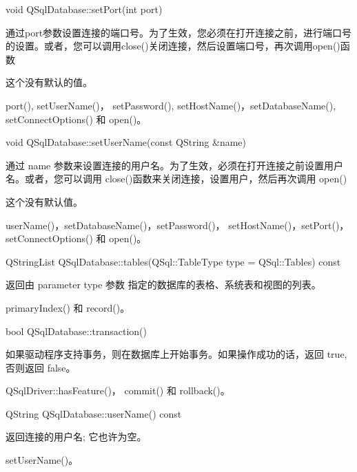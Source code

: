 void QSqlDatabase::setPort(int port)

通过port参数设置连接的端口号。为了生效，您必须在打开连接之前，进行端口号的设置。或者，您可以调用close()关闭连接，然后设置端口号，再次调用open()函数

这个没有默认的值。

\begin{notice}[另请查阅]
port(), setUserName()， setPassword(),
setHostName()，setDatabaseName(), setConnectOptions() 和 open()。
\end{notice}


void QSqlDatabase::setUserName(const QString \&name)

通过 name 参数来设置连接的用户名。为了生效，必须在打开连接之前设置用户名。或者，您可以调用 close()函数来关闭连接，设置用户，然后再次调用 open()

这个没有默认值。


\begin{notice}[另请查阅]
userName()，setDatabaseName()，setPassword()，
setHostName()，setPort()，setConnectOptions() 和 open()。
\end{notice}


QStringList QSqlDatabase::tables(QSql::TableType type = QSql::Tables) const

返回由 parameter type 参数 指定的数据库的表格、系统表和视图的列表。

\begin{notice}[另请查阅]
primaryIndex() 和 record()。
\end{notice}

bool QSqlDatabase::transaction()

如果驱动程序支持事务，则在数据库上开始事务。如果操作成功的话，返回 true, 否则返回 false。



\begin{notice}[另请查阅]
QSqlDriver::hasFeature()， commit() 和 rollback()。
\end{notice}

QString QSqlDatabase::userName() const

返回连接的用户名; 它也许为空。

\begin{notice}[另请查阅]
setUserName()。
\end{notice}

